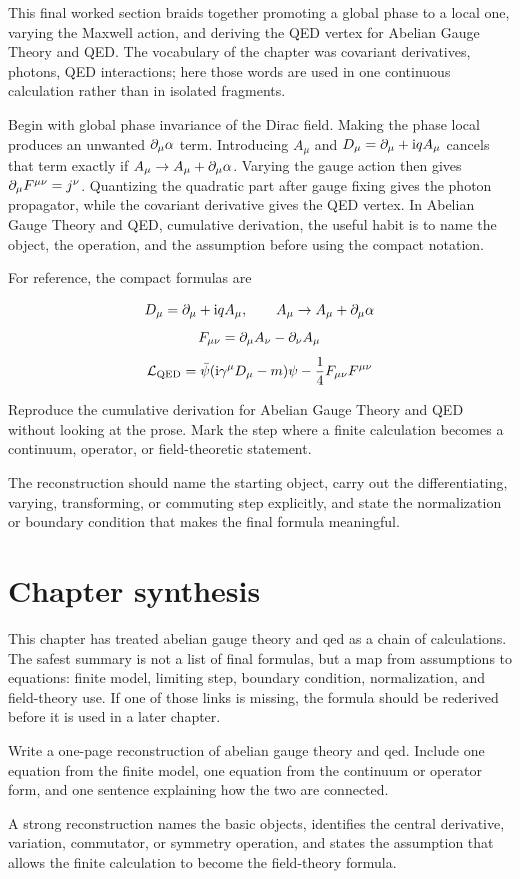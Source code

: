 This final worked section braids together promoting a global phase to a local one, varying the Maxwell action, and deriving the QED vertex for Abelian Gauge Theory and QED.  The vocabulary of the chapter was covariant derivatives, photons, QED interactions; here those words are used in one continuous calculation rather than in isolated fragments.

Begin with global phase invariance of the Dirac field.  Making the phase local produces an unwanted \(\partial_\mu\alpha\) term.  Introducing \(A_\mu\) and \(D_\mu=\partial_\mu+\mathrm i qA_\mu\) cancels that term exactly if \(A_\mu\to A_\mu+\partial_\mu\alpha\).  Varying the gauge action then gives \(\partial_\mu F^{\mu\nu}=j^\nu\).  Quantizing the quadratic part after gauge fixing gives the photon propagator, while the covariant derivative gives the QED vertex.  In Abelian Gauge Theory and QED, cumulative derivation, the useful habit is to name the object, the operation, and the assumption before using the compact notation.

For reference, the compact formulas are

\[
  D_\mu=\partial_\mu+\mathrm i qA_\mu,\qquad A_\mu\to A_\mu+\partial_\mu\alpha
\]
\[
  F_{\mu\nu}=\partial_\mu A_\nu-\partial_\nu A_\mu
\]
\[
  \mathcal L_{\mathrm{QED}}=\bar\psi(\mathrm i\gamma^\mu D_\mu-m)\psi-\frac14F_{\mu\nu}F^{\mu\nu}
\]

\begin{exercise}
Reproduce the cumulative derivation for Abelian Gauge Theory and QED without looking at the prose.  Mark the step where a finite calculation becomes a continuum, operator, or field-theoretic statement.
\begin{answer}
The reconstruction should name the starting object, carry out the differentiating, varying, transforming, or commuting step explicitly, and state the normalization or boundary condition that makes the final formula meaningful.
\end{answer}
\end{exercise}



\section{Chapter synthesis}

This chapter has treated abelian gauge theory and qed as a chain of calculations.  The safest summary is not a list of final formulas, but a map from assumptions to equations: finite model, limiting step, boundary condition, normalization, and field-theory use.  If one of those links is missing, the formula should be rederived before it is used in a later chapter.

\begin{exercise}
Write a one-page reconstruction of abelian gauge theory and qed.  Include one equation from the finite model, one equation from the continuum or operator form, and one sentence explaining how the two are connected.
\begin{answer}
A strong reconstruction names the basic objects, identifies the central derivative, variation, commutator, or symmetry operation, and states the assumption that allows the finite calculation to become the field-theory formula.
\end{answer}
\end{exercise}
